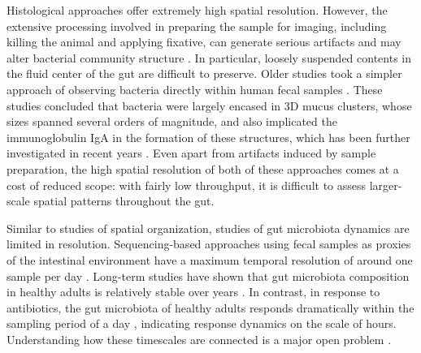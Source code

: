 Histological approaches offer extremely high spatial resolution. However, the extensive processing involved in preparing the sample for imaging, including killing the animal and applying fixative, can generate serious artifacts and may alter bacterial community structure \cite{tropini_gut_2017}. In particular, loosely suspended contents in the fluid center of the gut are difficult to preserve. Older studies took a simpler approach of observing bacteria directly within human fecal samples \cite{van_der_waaij_vivo_1996}. These studies concluded that bacteria were largely encased in 3D mucus clusters, whose sizes spanned several orders of magnitude, and also implicated the immunoglobulin IgA in the formation of these structures, which has been further investigated in recent years \cite{moor_high-avidity_2017}. Even apart from artifacts induced by sample preparation, the high spatial resolution of both of these approaches comes at a cost of reduced scope: with fairly low throughput, it is difficult to assess larger-scale spatial patterns throughout the gut. 

Similar to studies of spatial organization, studies of gut microbiota dynamics are limited in resolution. Sequencing-based approaches using fecal samples as proxies of the intestinal environment have a maximum temporal resolution of around one sample per day \cite{schlomann2019timescales}. Long-term studies have shown that gut microbiota composition in healthy adults is relatively stable over years \cite{zoetendal_temperature_1998,rajilic-stojanovic_long-term_2013,caporaso2011moving}. In contrast, in response to antibiotics, the gut microbiota of healthy adults responds dramatically within the sampling period of a day \cite{dethlefsen2011incomplete}, indicating response dynamics on the scale of hours. Understanding how these timescales are connected is a major open problem \cite{schlomann2019timescales}. 

